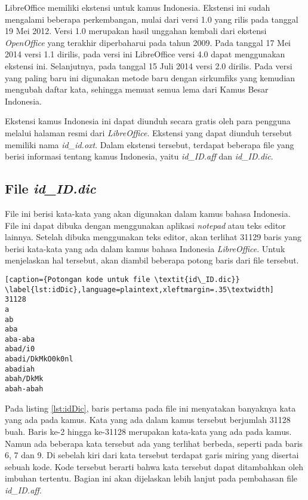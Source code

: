 LibreOffice memiliki ekstensi untuk kamus Indonesia. Ekstensi ini sudah mengalami beberapa perkembangan, mulai dari versi 1.0 yang rilis pada tanggal 19 Mei 2012. Versi 1.0 merupakan hasil unggahan kembali dari ekstensi \textit{OpenOffice} yang terakhir diperbaharui pada tahun 2009. Pada tanggal 17 Mei 2014 versi 1.1 dirilis, pada versi ini LibreOffice versi 4.0 dapat menggunakan ekstensi ini. Selanjutnya, pada tanggal 15 Juli 2014 versi 2.0 dirilis. Pada versi yang paling baru ini digunakan metode baru dengan sirkumfiks yang kemudian mengubah daftar kata, sehingga memuat semua lema dari Kamus Besar Indonesia.

Ekstensi kamus Indonesia ini dapat diunduh secara gratis oleh para pengguna melalui halaman resmi dari \textit{LibreOffice}. Ekstensi yang dapat diunduh tersebut memiliki nama \textit{id\_id.oxt}. Dalam ekstensi tersebut, terdapat beberapa file yang berisi informasi tentang kamus Indonesia, yaitu \textit{id\_ID.aff} dan \textit{id\_ID.dic}.

\subsection{File \textit{id\_ID.dic}}

File ini berisi kata-kata yang akan digunakan dalam kamus bahasa Indonesia. File ini dapat dibuka dengan menggunakan aplikasi \textit{notepad} atau teks editor lainnya. Setelah dibuka menggunakan teks editor, akan terlihat 31129 baris yang berisi kata-kata yang ada dalam kamus bahasa Indonesia \textit{LibreOffice}. Untuk menjelaskan hal tersebut, akan diambil beberapa potong baris dari file tersebut.
	
	\begin{lstlisting}[caption={Potongan kode untuk file \textit{id\_ID.dic}}			\label{lst:idDic},language=plaintext,xleftmargin=.35\textwidth] 
31128
a
ab
aba
aba-aba
abad/i0
abadi/DkMkO0k0nl
abadiah
abah/DkMk
abah-abah
	\end{lstlisting}	
	
Pada listing \ref{lst:idDic}, baris pertama pada file ini menyatakan banyaknya kata yang ada pada kamus. Kata yang ada dalam kamus tersebut berjumlah 31128 buah. Baris ke-2 hingga ke-31128 merupakan kata-kata yang ada pada kamus. Namun ada beberapa kata tersebut ada yang terlihat berbeda, seperti pada baris 6, 7 dan 9. Di sebelah kiri dari kata tersebut terdapat garis miring yang disertai sebuah kode. Kode tersebut berarti bahwa kata tersebut dapat ditambahkan oleh imbuhan tertentu. Bagian ini akan dijelaskan lebih lanjut pada pembahasan file \textit{id\_ID.aff}.


